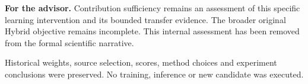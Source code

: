 \documentclass[
  10pt,
]{article}
\begin{document}
\textbf{For the advisor.} Contribution sufficiency remains an assessment
of this specific learning intervention and its bounded transfer
evidence. The broader original Hybrid objective remains incomplete. This
internal assessment has been removed from the formal scientific
narrative.

Historical weights, source selection, scores, method choices and
experiment conclusions were preserved. No training, inference or new
candidate was executed.
\end{document}
